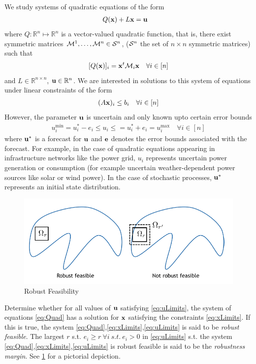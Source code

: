 
We study systems of quadratic equations of the form
\begin{align}
& Q(\bold x)+L\bold x=\bold u\label{eq:Quad}
\end{align}
where $Q: \mathbb{R}^n \mapsto \mathbb{R}^n$ is a vector-valued quadratic function, that is, there exist symmetric matrices $\mathcal{M}^1,\ldots,\mathcal{M}^{n} \in \mathcal{S}^{n}$, ($\mathcal{S}^{n}$ the set of $n \times n$ symmetric matrices) such that
\[[Q(\bold x)]_i = \bold x^t \mathcal{M}_{i} \bold x \quad \forall i \in [n]\]
and $L \in \mathbb{R}^{n\times n}$, $\bold u \in \mathbb{R}^n$. 
We are interested in solutions to this system of equations under linear constraints of the form
\begin{align}
(A\bold x)_i\leq b_i \quad \forall i \in [n]\label{eq:xLimits}
\end{align}
However, the parameter $\bold u$ is uncertain and only known upto certain error bounds
\begin{align}
u^{\min}_i=u_i^*-e_i \leq u_i \leq =u_i^*+e_i=u^{\max}_i \quad \forall i \in [n] \label{eq:uLimits}
\end{align}
where $\bold u^*$ is a forecast for $\bold u$ and $\bold e$ denotes the error bounds associated with the forecast. 
For example, in the case of quadratic equations appearing in infrastructure networks like the power grid, $u_i$ represents uncertain power generation or consumption (for example uncertain weather-dependent power sources like solar or wind power). 
In the case of stochastic processes, $\bold u^*$ represents an initial state distribution.

\begin{figure}
\begin{center}
\includegraphics[scale=0.5]{Figures/Rfeas}
\end{center}
\caption{Robust Feasibility}
\label{fig:RFeas}
\end{figure}

\begin{cdef}
\label{RobustDef}
Determine whether for all values of $\bold u$ satisfying \eqref{eq:uLimits}, the system of equations \eqref{eq:Quad} has a solution for $\bold x$ satisfying the constraints \eqref{eq:xLimits}. 
If this is true, the system \eqref{eq:Quad},\eqref{eq:xLimits},\eqref{eq:uLimits} is said to be \emph{robust feasible}. 
The largest $r$ s.t. $e_i\geq r \ \forall i \ s.t. \ e_i>0$ in \eqref{eq:uLimits} s.t. the system \eqref{eq:Quad},\eqref{eq:xLimits},\eqref{eq:uLimits} is robust feasible is said to be the \emph{robustness margin}. 
See \cref{fig:RFeas} for a pictorial depiction. 
\end{cdef}

